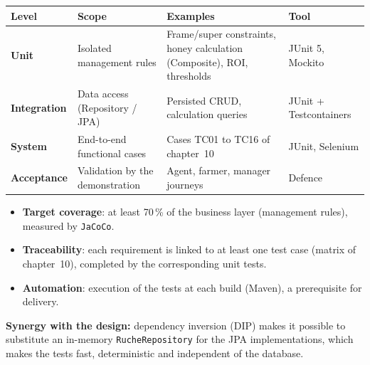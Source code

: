 \begin{xltabular}{\textwidth}{>{\bfseries}p{2.8cm} X p{4.4cm} C{2.2cm}}
\toprule
\textbf{Level} & \textbf{Scope} & \textbf{Examples} & \textbf{Tool} \\
\midrule
\endhead
Unit         & Isolated management rules           & Frame/super constraints, honey calculation (Composite), ROI, thresholds & JUnit 5, Mockito \\
Integration  & Data access (Repository / JPA)      & Persisted CRUD, calculation queries                                     & JUnit + Testcontainers \\
System       & End-to-end functional cases         & Cases TC01 to TC16 of chapter~10                                        & JUnit, Selenium \\
Acceptance   & Validation by the demonstration     & Agent, farmer, manager journeys                                         & Defence \\
\bottomrule
\end{xltabular}

\begin{itemize}
  \item \textbf{Target coverage}: at least 70\,\% of the business layer (management rules), measured by \texttt{JaCoCo}.
  \item \textbf{Traceability}: each requirement is linked to at least one test case (matrix of chapter~10), completed by the corresponding unit tests.
  \item \textbf{Automation}: execution of the tests at each build (Maven), a prerequisite for delivery.
\end{itemize}

\begin{encadre}
\textbf{Synergy with the design:} dependency inversion (DIP) makes it possible to
substitute an in-memory \texttt{RucheRepository} for the JPA implementations,
which makes the tests fast, deterministic and independent of the database.
\end{encadre}
